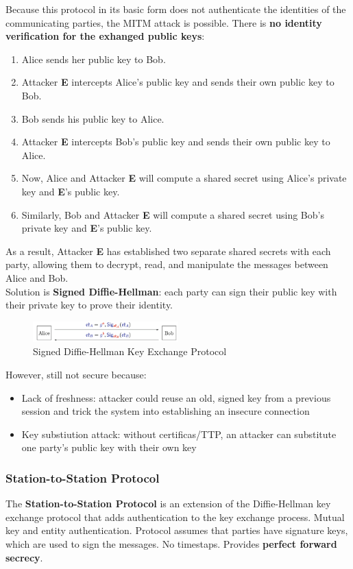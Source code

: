 Because this protocol in its basic form does not authenticate the identities of the communicating parties, the MITM attack is possible.
There is \textbf{no identity verification for the exhanged public keys}:
\begin{enumerate}
    \item Alice sends her public key to Bob.
    \item Attacker \textbf{E} intercepts Alice's public key and sends their own public key to Bob.
    \item Bob sends his public key to Alice.
    \item Attacker \textbf{E} intercepts Bob's public key and sends their own public key to Alice.
    \item Now, Alice and Attacker \textbf{E} will compute a shared secret using Alice's private key and \textbf{E}'s public key.
    \item Similarly, Bob and Attacker \textbf{E} will compute a shared secret using Bob's private key and \textbf{E}'s public key.
\end{enumerate}
As a result, Attacker \textbf{E} has established two separate shared secrets with each party, allowing them to decrypt, read, and manipulate the messages between Alice and Bob. \\

Solution is \textbf{Signed Diffie-Hellman}: each party can sign their public key with their private key to prove their identity.

\begin{figure}[h!]
    \centering
    \includegraphics[width=0.5\textwidth]{img/signedDH.png}
    \caption{Signed Diffie-Hellman Key Exchange Protocol}
\end{figure}

However, still not secure because:
\begin{itemize}
    \item Lack of freshness: attacker could reuse an old, signed key from a previous session and trick the system into establishing an insecure connection
    \item Key substiution attack: without certificas/TTP, an attacker can substitute one party’s public key with their own key
\end{itemize}

\subsubsection{Station-to-Station Protocol}
The \textbf{Station-to-Station Protocol} is an extension of the Diffie-Hellman key exchange protocol that adds authentication to the 
key exchange process. Mutual key and entity authentication. Protocol assumes that
parties have signature keys, which are used to sign the messages.
No timestaps. Provides \textbf{perfect forward secrecy}.

